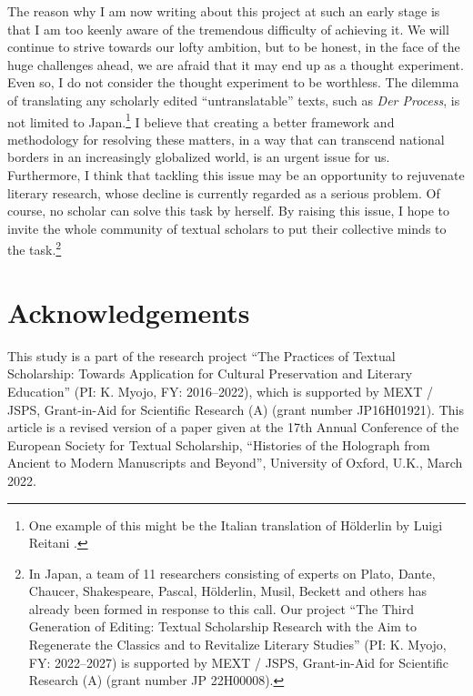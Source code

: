 \begin{paper}
The reason why I am now writing about this project at such an early
stage is that I am too keenly aware of the tremendous difficulty of
achieving it. We will continue to strive towards our lofty ambition, but
to be honest, in the face of the huge challenges ahead, we are afraid
that it may end up as a thought experiment. Even so, I do not
consider the thought experiment to be worthless. The dilemma of
translating any scholarly edited ``untranslatable'' texts, such as
\emph{Der Process}, is not limited to Japan.\footnote{One example of this
  might be the Italian translation of Hölderlin by Luigi Reitani
  \citep{holderlin_tutte_2001}.} I believe that creating a better framework and methodology for resolving these
matters, in a way that can transcend national borders in an increasingly
globalized world, is an urgent issue for us. Furthermore, I think that tackling this issue may be
an opportunity to rejuvenate literary research, whose decline is currently
regarded as a serious problem. Of course, no scholar can solve
this task by herself. By raising this issue, I hope to invite the whole
community of textual scholars to put their collective minds to the
task.\footnote{In Japan, a team of 11 researchers consisting of experts
  on Plato, Dante, Chaucer, Shakespeare, Pascal, Hölderlin, Musil,
  Beckett and others has already been formed in response to this call.
  Our project ``The Third Generation of Editing: Textual Scholarship
  Research with the Aim to Regenerate the Classics and to Revitalize
  Literary Studies'' (PI: K. Myojo, FY: 2022--2027) is supported by MEXT
  / JSPS, Grant-in-Aid for Scientific Research (A) (grant number JP
  22H00008).}

\section*{Acknowledgements} This study is a part of the research project
``The Practices of Textual Scholarship: Towards Application for Cultural
Preservation and Literary Education'' (PI: K. Myojo, FY: 2016--2022),
which is supported by MEXT / JSPS, Grant-in-Aid for Scientific Research
(A) (grant number JP16H01921). This article is a revised version of a paper given at the 17th Annual Conference of the European Society for Textual Scholarship, ``Histories of the Holograph from Ancient to Modern Manuscripts and Beyond'', University of Oxford, U.K., March 2022.


\begin{flushleft}
    \renewcommand*{\mkbibnamefamily}[1]{\textsc{#1}}
    \renewcommand*{\mkbibnamegiven}[1]{\textsc{#1}} 
\printbibliography
\end{flushleft}

\end{paper}